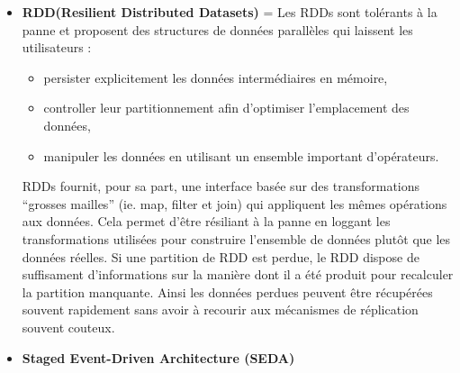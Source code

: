 \documentclass[french]{article}
\begin{document}
\begin{itemize}[label=\textbullet]
	\item \textbf{RDD(Resilient Distributed Datasets)} =  Les RDDs sont tolérants à la panne et proposent des structures de données parallèles qui laissent les utilisateurs :
		\begin{itemize}
    		\item persister explicitement les données intermédiaires en mémoire,
    		\item controller leur partitionnement afin d’optimiser l’emplacement des données,
    		\item manipuler les données en utilisant un ensemble important d’opérateurs.
		\end{itemize}
		RDDs fournit, pour sa part, une interface basée sur des transformations “grosses mailles” (ie. map, filter et join) qui appliquent les mêmes opérations aux données. Cela permet d’être résiliant à la panne en loggant les transformations utilisées pour construire l’ensemble de données plutôt que les données réelles. Si une partition de RDD est perdue, le RDD dispose de suffisament d’informations sur la manière dont il a été produit pour recalculer la partition manquante. Ainsi les données perdues peuvent être récupérées souvent rapidement sans avoir à recourir aux mécanismes de réplication souvent couteux.
\item \textbf{Staged Event-Driven Architecture (SEDA)} 		
\end{itemize}
\end{document}
